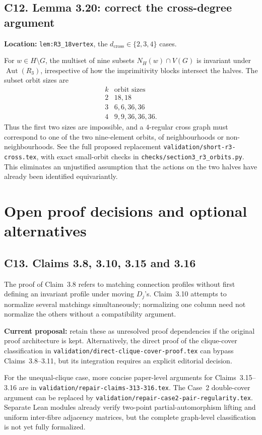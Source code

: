 \documentclass[11pt,a4paper]{article}
\begin{document}
\subsection*{C12. Lemma 3.20: correct the cross-degree argument}
\textbf{Location:} \texttt{lem:R3\_18vertex},
the \(d_{\mathrm{cross}}\in\{2,3,4\}\) cases.

For \(w\in H\setminus G\), the multiset of nine
subsets \(N_H(w)\cap V(G)\) is invariant under
\(\operatorname{Aut}(R_3)\), irrespective of how
the imprimitivity blocks intersect the halves.
The subset orbit sizes are
\[
\begin{array}{c|l}
k&\text{orbit sizes}\\ \hline
2&18,18\\
3&6,6,36,36\\
4&9,9,36,36,36 .
\end{array}
\]
Thus the first two sizes are impossible,
and a \(4\)-regular cross graph must
correspond to one of the two nine-element
orbits, of neighbourhoods or non-neighbourhoods.
See the full proposed replacement
\texttt{validation/short-r3-cross.tex},
with exact small-orbit checks in
\texttt{checks/section3\_r3\_orbits.py}.
This eliminates an unjustified assumption that the
actions on the two halves have already been
identified equivariantly.


\section*{Open proof decisions and optional alternatives}

\subsection*{C13. Claims 3.8, 3.10, 3.15 and 3.16}
The proof of Claim~3.8 refers to matching
connection profiles without first defining an invariant
profile under moving \(D_j\)'s. Claim~3.10 attempts
to normalize several matchings simultaneously;
normalizing one column need not normalize the others
without a compatibility argument.

\textbf{Current proposal:} retain these as unresolved
proof dependencies if the original proof architecture
is kept. Alternatively, the direct proof of the
clique-cover classification in
\texttt{validation/direct-clique-cover-proof.tex}
can bypass Claims~3.8--3.11, but its integration
requires an explicit editorial decision.

For the unequal-clique case, more concise
paper-level arguments for Claims~3.15--3.16 are in
\texttt{validation/repair-claims-313-316.tex}.
The Case~2 double-cover argument can be replaced by
\texttt{validation/repair-case2-pair-regularity.tex}.
Separate Lean modules already verify two-point
partial-automorphism lifting and uniform
inter-fibre adjacency matrices, but the complete
graph-level classification is not yet fully
formalized.
\end{document}

